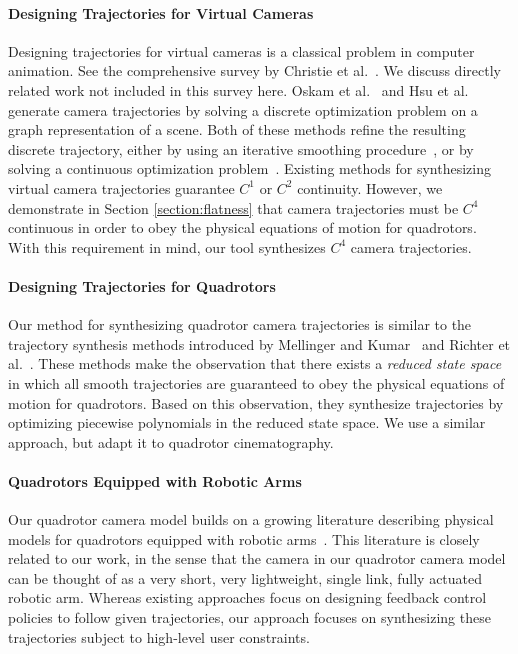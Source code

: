 \paragraph{Designing Trajectories for Virtual Cameras}
Designing trajectories for virtual cameras is a classical problem in computer animation.
See the comprehensive survey by Christie et al.~.
We discuss directly related work not included in this survey here.
Oskam et al.~ and Hsu et al.~ generate camera trajectories by solving a discrete optimization problem on a graph representation of a scene.
Both of these methods refine the resulting  discrete trajectory, either by using an iterative smoothing procedure~\cite{oskam:2009}, or by solving a continuous optimization problem~\cite{hsu:2013}.
Existing methods for synthesizing virtual camera trajectories guarantee $C^1$ or $C^2$ continuity.
However, we demonstrate in Section \ref{section:flatness} that camera trajectories must be $C^4$ continuous in order to obey the physical equations of motion for quadrotors.
With this requirement in mind, our tool synthesizes $C^4$ camera trajectories.

\paragraph{Designing Trajectories for Quadrotors}
Our method for synthesizing quadrotor camera trajectories is similar to the trajectory synthesis methods introduced by Mellinger and Kumar~ and Richter et al.~.
These methods make the observation that there exists a \emph{reduced state space} in which all smooth trajectories are guaranteed to obey the physical equations of motion for quadrotors.
Based on this observation, they synthesize trajectories by optimizing piecewise polynomials in the reduced state space.
We use a similar approach, but adapt it to quadrotor cinematography.

\paragraph{Quadrotors Equipped with Robotic Arms}
Our quadrotor camera model builds on a growing literature describing physical models for quadrotors equipped with robotic arms~\cite{lipiello:2012,kim:2013,yang:2014,ruggiero:2015}.
This literature is closely related to our work, in the sense that the camera in our quadrotor camera model can be thought of as a very short, very lightweight, single link, fully actuated robotic arm.
Whereas existing approaches focus on designing feedback control policies to follow given trajectories, our approach focuses on synthesizing these trajectories subject to high-level user constraints.

